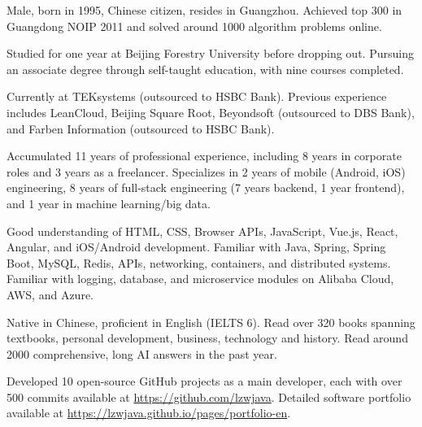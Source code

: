

\begin{cventry}
    {} %
    {} %
    {} %
    {} %
    {
        \begin{cvitems}
            \item {Male, born in 1995, Chinese citizen, resides in Guangzhou. Achieved top 300 in Guangdong NOIP 2011 and solved around 1000 algorithm problems online.}
            \item {Studied for one year at Beijing Forestry University before dropping out. Pursuing an associate degree through self-taught education, with nine courses completed.}
            \item {Currently at TEKsystems (outsourced to HSBC Bank). Previous experience includes LeanCloud, Beijing Square Root, Beyondsoft (outsourced to DBS Bank), and Farben Information (outsourced to HSBC Bank).}
            \item {Accumulated 11 years of professional experience, including 8 years in corporate roles and 3 years as a freelancer. Specializes in 2 years of mobile (Android, iOS) engineering, 8 years of full-stack engineering (7 years backend, 1 year frontend), and 1 year in machine learning/big data.}
            \item {Good understanding of HTML, CSS, Browser APIs, JavaScript, Vue.js, React, Angular, and iOS/Android development. Familiar with Java, Spring, Spring Boot, MySQL, Redis, APIs, networking, containers, and distributed systems. Familiar with logging, database, and microservice modules on Alibaba Cloud, AWS, and Azure.}
            \item {Native in Chinese, proficient in English (IELTS 6). Read over 320 books spanning textbooks, personal development, business, technology and history. Read around 2000 comprehensive, long AI answers in the past year.}
            \item {Developed 10 open-source GitHub projects as a main developer, each with over 500 commits available at \href{https://github.com/lzwjava}{https://github.com/lzwjava}. Detailed software portfolio available at \href{https://lzwjava.github.io/pages/portfolio-en}{https://lzwjava.github.io/pages/portfolio-en}.}

\end{cvitems}}
\end{cventry}
